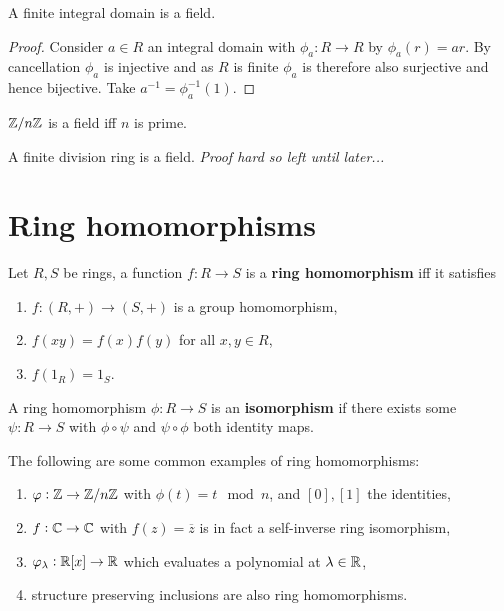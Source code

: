 \documentclass{report}
\begin{document}
\begin{lemma}
    A finite integral domain is a field. \begin{proof}
        Consider $a\in R$ an integral domain with $\phi_a:R\rightarrow R$ by $\phi_a(r)=ar$. By cancellation $\phi_a$ is injective and as $R$ is finite $\phi_a$ is therefore also surjective and hence bijective. Take $a^{-1}=\phi_a^{-1}(1)$.
    \end{proof}
\end{lemma}

\begin{corollary}
    $\mathbb{Z}/n\mathbb{Z}$ is a field iff $n$ is prime.
\end{corollary}

\begin{theorem}[Wedderburn]
    A finite division ring is a field. \textit{Proof hard so left until later...}
\end{theorem}

\section{Ring homomorphisms}

\begin{definition}
    Let $R,S$ be rings, a function $f:R\rightarrow S$ is a \textbf{ring homomorphism} iff it satisfies \begin{enumerate}
        \item $f:(R,+)\rightarrow (S,+)$ is a group homomorphism,
        \item $f(xy)=f(x)f(y)$ for all $x,y\in R$,
        \item $f(1_R)=1_S$.
    \end{enumerate}
    A ring homomorphism $\phi:R\rightarrow S$ is an \textbf{isomorphism} if there exists some $\psi:R\rightarrow S$ with $\phi\circ\psi$ and $\psi\circ\phi$ both identity maps.
\end{definition}

\begin{examples}
    The following are some common examples of ring homomorphisms: \begin{enumerate}
        \item $\varphi:\mathbb{Z}\rightarrow\mathbb{Z}/n\mathbb{Z}$ with $\phi(t)= t\mod{n}$, and $[0], [1]$ the identities,
        \item $f:\mathbb{C}\rightarrow\mathbb{C}$ with $f(z)=\overline{z}$ is in fact a self-inverse ring isomorphism,
        \item $\varphi_\lambda:\mathbb{R}[x]\rightarrow\mathbb{R}$ which evaluates a polynomial at $\lambda\in\mathbb{R}$,
        \item structure preserving inclusions are also ring homomorphisms.
    \end{enumerate}
\end{examples}
\end{document}
